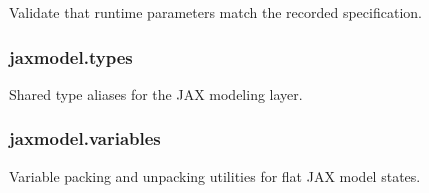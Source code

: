 \documentclass[letterpaper,10pt,english,openany,oneside]{sphinxmanual}
\begin{document}
\begin{fulllineitems}
\begin{fulllineitems}
\end{fulllineitems}


\begin{fulllineitems}
\label{\detokenize{api/core/jaxmodel/parameters:jaxmodel.parameters.ParameterSpec.validate}}
\pysigstartsignatures
{}
\pysigstopsignatures
\sphinxAtStartPar
Validate that runtime parameters match the recorded specification.

\end{fulllineitems}


\end{fulllineitems}


\sphinxstepscope


\subsubsection{jaxmodel.types}
\label{\detokenize{api/core/jaxmodel/types:module-jaxmodel.types}}\label{\detokenize{api/core/jaxmodel/types:jaxmodel-types}}\label{\detokenize{api/core/jaxmodel/types::doc}}
\sphinxAtStartPar
Shared type aliases for the JAX modeling layer.

\sphinxstepscope


\subsubsection{jaxmodel.variables}
\label{\detokenize{api/core/jaxmodel/variables:module-jaxmodel.variables}}\label{\detokenize{api/core/jaxmodel/variables:jaxmodel-variables}}\label{\detokenize{api/core/jaxmodel/variables::doc}}
\sphinxAtStartPar
Variable packing and unpacking utilities for flat JAX model states.
\end{document}
